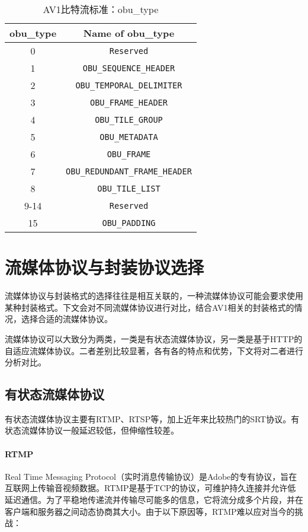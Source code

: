 \begin{table}[!hpt]
    \renewcommand{\arraystretch}{0.8}
    \caption[obu\_type]{AV1比特流标准：obu\_type}
    \label{tab:obutype}
    \centering
    \begin{tabular}{cc} \toprule
      obu\_type & Name of obu\_type\\ \midrule
      0    & \texttt{Reserved}  \\
      1    & \texttt{OBU\_SEQUENCE\_HEADER}     \\
      2    & \texttt{OBU\_TEMPORAL\_DELIMITER}   \\
      3    & \texttt{OBU\_FRAME\_HEADER}   \\
      4    & \texttt{OBU\_TILE\_GROUP}     \\
      5    & \texttt{OBU\_METADATA}     \\
      6    & \texttt{OBU\_FRAME}     \\
      7    & \texttt{OBU\_REDUNDANT\_FRAME\_HEADER}     \\
      8    & \texttt{OBU\_TILE\_LIST}     \\
      9-14 & \texttt{Reserved}     \\
      15   & \texttt{OBU\_PADDING}     \\ \bottomrule
    \end{tabular}
  \end{table}


\section{流媒体协议与封装协议选择}

流媒体协议与封装格式的选择往往是相互关联的，一种流媒体协议可能会要求使用某种封装格式。下文会对不同流媒体协议进行对比，结合AV1相关的封装格式的情况，选择合适的流媒体协议。

流媒体协议可以大致分为两类，一类是有状态流媒体协议，另一类是基于HTTP的自适应流媒体协议。二者差别比较显著，各有各的特点和优势，下文将对二者进行分析对比。


\subsection{有状态流媒体协议}

有状态流媒体协议主要有RTMP、RTSP等，加上近年来比较热门的SRT协议。有状态流媒体协议一般延迟较低，但伸缩性较差。

\paragraph{RTMP} Real Time Messaging Protocol（实时消息传输协议）是Adobe的专有协议，旨在互联网上传输音视频数据。RTMP是基于TCP的协议，可维护持久连接并允许低延迟通信。为了平稳地传递流并传输尽可能多的信息，它将流分成多个片段，并在客户端和服务器之间动态协商其大小。由于以下原因等，RTMP难以应对当今的挑战：

